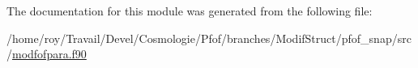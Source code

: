 The documentation for this module was generated from the following file\-:\begin{DoxyCompactItemize}
\item 
/home/roy/\-Travail/\-Devel/\-Cosmologie/\-Pfof/branches/\-Modif\-Struct/pfof\-\_\-snap/src/\hyperlink{pfof__snap_2src_2modfofpara_8f90}{modfofpara.\-f90}\end{DoxyCompactItemize}
